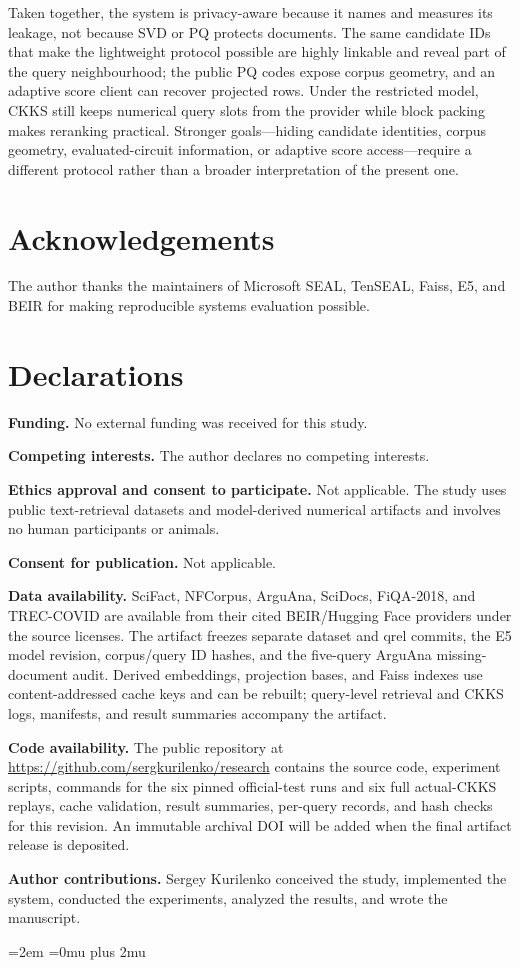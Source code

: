 \documentclass[pdflatex,sn-basic,Numbered]{sn-jnl}
\theoremstyle{plain}
\begin{document}
Taken together, the system is privacy-aware because it names and measures its leakage, not because SVD or PQ protects documents. The same candidate IDs that make the lightweight protocol possible are highly linkable and reveal part of the query neighbourhood; the public PQ codes expose corpus geometry, and an adaptive score client can recover projected rows. Under the restricted model, CKKS still keeps numerical query slots from the provider while block packing makes reranking practical. Stronger goals---hiding candidate identities, corpus geometry, evaluated-circuit information, or adaptive score access---require a different protocol rather than a broader interpretation of the present one.

\backmatter

\section*{Acknowledgements}

The author thanks the maintainers of Microsoft SEAL, TenSEAL, Faiss, E5, and BEIR for making reproducible systems evaluation possible.

\section*{Declarations}

\textbf{Funding.} No external funding was received for this study.

\textbf{Competing interests.} The author declares no competing interests.

\textbf{Ethics approval and consent to participate.} Not applicable. The study uses public text-retrieval datasets and model-derived numerical artifacts and involves no human participants or animals.

\textbf{Consent for publication.} Not applicable.

\textbf{Data availability.} SciFact, NFCorpus, ArguAna, SciDocs, FiQA-2018, and TREC-COVID are available from their cited BEIR/Hugging Face providers under the source licenses. The artifact freezes separate dataset and qrel commits, the E5 model revision, corpus/query ID hashes, and the five-query ArguAna missing-document audit. Derived embeddings, projection bases, and Faiss indexes use content-addressed cache keys and can be rebuilt; query-level retrieval and CKKS logs, manifests, and result summaries accompany the artifact.

\textbf{Code availability.} The public repository at \url{https://github.com/sergkurilenko/research} contains the source code, experiment scripts, commands for the six pinned official-test runs and six full actual-CKKS replays, cache validation, result summaries, per-query records, and hash checks for this revision. An immutable archival DOI will be added when the final artifact release is deposited.

\textbf{Author contributions.} Sergey Kurilenko conceived the study, implemented the system, conducted the experiments, analyzed the results, and wrote the manuscript.

\begingroup
\emergencystretch=2em
\Urlmuskip=0mu plus 2mu\relax

\endgroup
\end{document}
